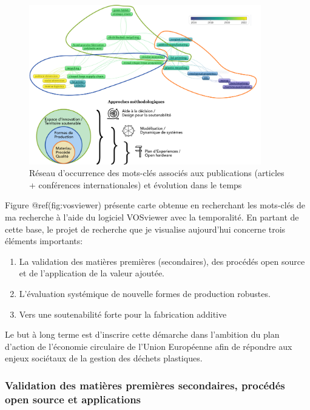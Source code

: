 \documentclass[
  11pt,
]{article}
\providecommand{\tightlist}{%
  \setlength{\itemsep}{0pt}\setlength{\parskip}{0pt}}\usepackage{longtable,booktabs,array}
\begin{document}
\begin{figure}[H]

{\centering \includegraphics[width=0.9\textwidth,height=\textheight]{Figures/Vosviewer/Vosviewer-Fabio.pdf}

}

\caption{Réseau d'occurrence des mots-clés associés aux publications
(articles + conférences internationales) et évolution dans le temps}

\end{figure}

Figure @ref(fig:vosviewer) présente carte obtenue en recherchant les
mots-clés de ma recherche à l'aide du logiciel VOSviewer avec la
temporalité. En partant de cette base, le projet de recherche que je
visualise aujourd'hui concerne trois éléments importants:

\begin{enumerate}
\def\labelenumi{\arabic{enumi}.}
\tightlist
\item
  La validation des matières premières (secondaires), des procédés open
  source et de l'application de la valeur ajoutée.
\item
  L'évaluation systémique de nouvelle formes de production robustes.
\item
  Vers une soutenabilité forte pour la fabrication additive
\end{enumerate}

Le but à long terme est d'inscrire cette démarche dans l'ambition du
plan d'action de l'économie circulaire de l'Union Européenne afin de
répondre aux enjeux sociétaux de la gestion des déchets plastiques.

\hypertarget{validation-des-matiuxe8res-premiuxe8res-secondaires-procuxe9duxe9s-open-source-et-applications}{%
\subsubsection{Validation des matières premières secondaires, procédés
open source et
applications}\label{validation-des-matiuxe8res-premiuxe8res-secondaires-procuxe9duxe9s-open-source-et-applications}}
\end{document}
